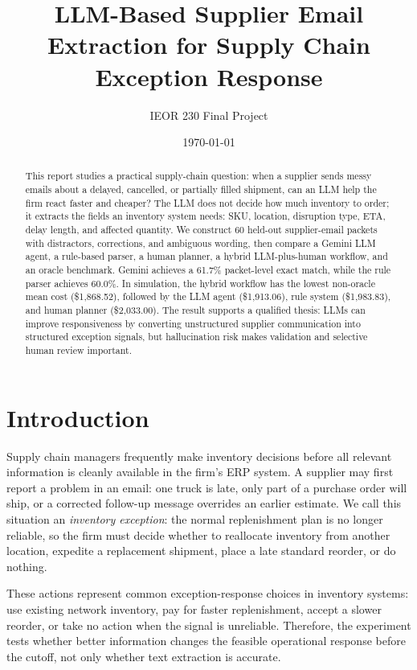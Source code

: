 \documentclass[11pt]{article}
\title{\vspace{-1.5em}LLM-Based Supplier Email Extraction for Supply Chain Exception Response}
\author{IEOR 230 Final Project}
\date{\today}
\begin{document}
\maketitle

\begin{abstract}
This report studies a practical supply-chain question: when a supplier sends messy emails about a delayed, cancelled, or partially filled shipment, can an LLM help the firm react faster and cheaper? The LLM does not decide how much inventory to order; it extracts the fields an inventory system needs: SKU, location, disruption type, ETA, delay length, and affected quantity. We construct 60 held-out supplier-email packets with distractors, corrections, and ambiguous wording, then compare a Gemini LLM agent, a rule-based parser, a human planner, a hybrid LLM-plus-human workflow, and an oracle benchmark. Gemini achieves a 61.7\% packet-level exact match, while the rule parser achieves 60.0\%. In simulation, the hybrid workflow has the lowest non-oracle mean cost (\$1,868.52), followed by the LLM agent (\$1,913.06), rule system (\$1,983.83), and human planner (\$2,033.00). The result supports a qualified thesis: LLMs can improve responsiveness by converting unstructured supplier communication into structured exception signals, but hallucination risk makes validation and selective human review important.
\end{abstract}

\section{Introduction}

Supply chain managers frequently make inventory decisions before all relevant information is cleanly available in the firm's ERP system. A supplier may first report a problem in an email: one truck is late, only part of a purchase order will ship, or a corrected follow-up message overrides an earlier estimate. We call this situation an \emph{inventory exception}: the normal replenishment plan is no longer reliable, so the firm must decide whether to reallocate inventory from another location, expedite a replacement shipment, place a late standard reorder, or do nothing.

These actions represent common exception-response choices in inventory systems: use existing network inventory, pay for faster replenishment, accept a slower reorder, or take no action when the signal is unreliable. Therefore, the experiment tests whether better information changes the feasible operational response before the cutoff, not only whether text extraction is accurate.
\end{document}
